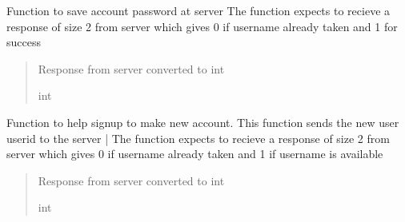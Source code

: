 \documentclass[letterpaper,10pt,english]{sphinxmanual}
\begin{document}
\begin{fulllineitems}
\begin{fulllineitems}
\end{fulllineitems}


\begin{fulllineitems}
\label{\detokenize{Message:Message.Message._signuppass}}
\pysigstartsignatures
{}
\pysigstopsignatures
\sphinxAtStartPar
Function to save account password at server
The function expects to recieve a response of size 2 from server which gives 0 if username already taken and 1 for success
\begin{quote}\begin{description}
\sphinxAtStartPar
Response from server converted to int

\sphinxAtStartPar
int

\end{description}\end{quote}

\end{fulllineitems}


\begin{fulllineitems}
\label{\detokenize{Message:Message.Message._signupuid}}
\pysigstartsignatures
{}
\pysigstopsignatures
\sphinxAtStartPar
Function to help signup to make new account. This function sends the new user userid to the server |
The function expects to recieve a response of size 2 from server which gives 0 if username already taken and 1 if username is available
\begin{quote}\begin{description}
\sphinxAtStartPar
Response from server converted to int

\sphinxAtStartPar
int

\end{description}\end{quote}

\end{fulllineitems}



\end{fulllineitems}
\end{document}
